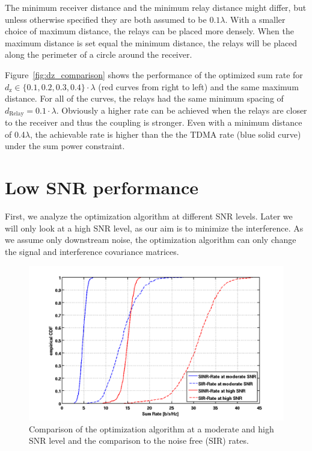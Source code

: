 The minimum receiver distance and the minimum relay distance might differ, but unless otherwise specified they are both assumed to be $0.1\lambda$.
With a smaller choice of maximum distance, the relays can be placed more densely.
When the maximum distance is set equal the minimum distance, the relays will be placed along the perimeter of a circle around the receiver.

Figure~\ref{fig:dz_comparison} shows the performance of the optimized sum rate for $d_\text{z}\in\{0.1,0.2,0.3,0.4\}\cdot\lambda$ (red curves from right to left) and the same maximum distance.
For all of the curves, the relays had the same minimum spacing of $d_\text{Relay}=0.1\cdot\lambda$.
Obviously a higher rate can be achieved when the relays are closer to the receiver and thus the coupling is stronger.
Even with a minimum distance of 0.4$\lambda$, the achievable rate is higher than the the TDMA rate (blue solid curve) under the sum power constraint.

\section{Low SNR performance}
\label{sec:low_snr}

First, we analyze the optimization algorithm at different SNR levels.
Later we will only look at a high SNR level, as our aim is to minimize the interference.
As we assume only downstream noise, the optimization algorithm can only change the signal and interference covariance matrices.
\begin{figure}[h]
\centering
  \includegraphics[width=0.9\linewidth]{images/Comparison_modvshighSNR.png}
\caption{Comparison of the optimization algorithm at a moderate and high SNR level and the comparison to the noise free (SIR) rates.}
\label{fig:snrcomparison}
\end{figure}

